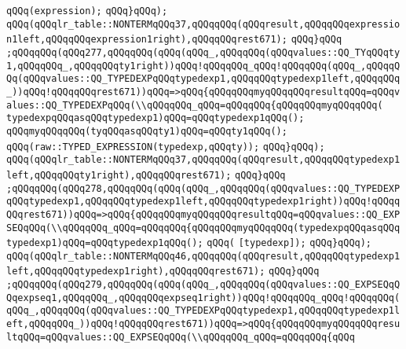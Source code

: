 \verb|qQQq(expression);|\newline
\verb|qQQq}qQQq);|\newline
\verb|qQQq(qQQqlr_table::NONTERMqQQq37,qQQqqQQq(qQQqresult,qQQqqQQqexpression1left,qQQqqQQqexpression1right),qQQqqQQqrest671);|\newline
\verb|qQQq}qQQq|\newline
\verb|;qQQqqQQq(qQQq277,qQQqqQQq(qQQq(qQQq_,qQQqqQQq(qQQqvalues::QQ_TYqQQqty1,qQQqqQQq_,qQQqqQQqty1right))qQQq!qQQqqQQq_qQQq!qQQqqQQq(qQQq_,qQQqqQQq(qQQqvalues::QQ_TYPEDEXPqQQqtypedexp1,qQQqqQQqtypedexp1left,qQQqqQQq_))qQQq!qQQqqQQqrest671))qQQq=>qQQq{qQQqqQQqmyqQQqqQQqresultqQQq=qQQqvalues::QQ_TYPEDEXPqQQq(\\qQQqqQQq_qQQq=qQQqqQQq{qQQqqQQqmyqQQqqQQq(|\newline
\verb|typedexpqQQqasqQQqtypedexp1)qQQq=qQQqtypedexp1qQQq();|\newline
\verb|qQQqmyqQQqqQQq(tyqQQqasqQQqty1)qQQq=qQQqty1qQQq();|\newline
\verb|qQQq(raw::TYPED_EXPRESSION(typedexp,qQQqty));|\newline
\verb|qQQq}qQQq);|\newline
\verb|qQQq(qQQqlr_table::NONTERMqQQq37,qQQqqQQq(qQQqresult,qQQqqQQqtypedexp1left,qQQqqQQqty1right),qQQqqQQqrest671);|\newline
\verb|qQQq}qQQq|\newline
\verb|;qQQqqQQq(qQQq278,qQQqqQQq(qQQq(qQQq_,qQQqqQQq(qQQqvalues::QQ_TYPEDEXPqQQqtypedexp1,qQQqqQQqtypedexp1left,qQQqqQQqtypedexp1right))qQQq!qQQqqQQqrest671))qQQq=>qQQq{qQQqqQQqmyqQQqqQQqresultqQQq=qQQqvalues::QQ_EXPSEQqQQq(\\qQQqqQQq_qQQq=qQQqqQQq{qQQqqQQqmyqQQqqQQq(typedexpqQQqasqQQqtypedexp1)qQQq=qQQqtypedexp1qQQq();|\newline
\verb|qQQq(|\newline
\verb|[typedexp]);|\newline
\verb|qQQq}qQQq);|\newline
\verb|qQQq(qQQqlr_table::NONTERMqQQq46,qQQqqQQq(qQQqresult,qQQqqQQqtypedexp1left,qQQqqQQqtypedexp1right),qQQqqQQqrest671);|\newline
\verb|qQQq}qQQq|\newline
\verb|;qQQqqQQq(qQQq279,qQQqqQQq(qQQq(qQQq_,qQQqqQQq(qQQqvalues::QQ_EXPSEQqQQqexpseq1,qQQqqQQq_,qQQqqQQqexpseq1right))qQQq!qQQqqQQq_qQQq!qQQqqQQq(qQQq_,qQQqqQQq(qQQqvalues::QQ_TYPEDEXPqQQqtypedexp1,qQQqqQQqtypedexp1left,qQQqqQQq_))qQQq!qQQqqQQqrest671))qQQq=>qQQq{qQQqqQQqmyqQQqqQQqresultqQQq=qQQqvalues::QQ_EXPSEQqQQq(\\qQQqqQQq_qQQq=qQQqqQQq{qQQq|\newline
